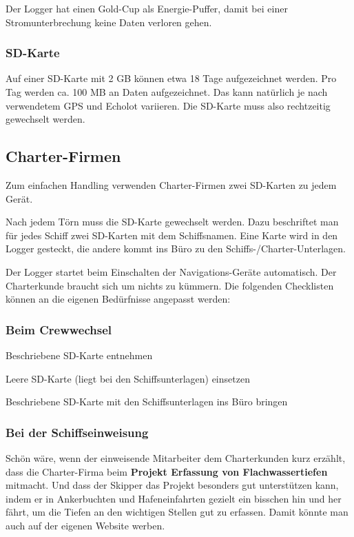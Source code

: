 \documentclass[pdftex, 8pt, paper=130mm:92mm,pagesize]{scrartcl}
\begin{document}
Der Logger hat einen Gold-Cup als Energie-Puffer, damit bei einer Stromunterbrechung keine Daten verloren gehen.	

\subsubsection{SD-Karte}

Auf einer SD-Karte mit 2 GB können etwa 18 Tage aufgezeichnet werden. Pro Tag werden ca. 100 MB an Daten aufgezeichnet. Das kann natürlich je nach verwendetem GPS und Echolot variieren. 
Die SD-Karte muss also rechtzeitig gewechselt werden. 

\subsection{Charter-Firmen}

Zum einfachen Handling verwenden Charter-Firmen zwei SD-Karten zu jedem Gerät. 

Nach jedem Törn muss die SD-Karte gewechselt werden. Dazu beschriftet man für jedes Schiff zwei SD-Karten mit dem Schiffsnamen. Eine Karte wird in den Logger gesteckt, die andere kommt ins Büro zu den Schiffs-/Charter-Unterlagen. 

Der Logger startet beim Einschalten der Navigations-Geräte automatisch. Der Charterkunde braucht sich um nichts zu kümmern. Die folgenden Checklisten können an die eigenen Bedürfnisse angepasst werden: 

\subsubsection{Beim Crewwechsel} 
\begin{compactenum}
\item Beschriebene SD-Karte entnehmen 
\item Leere SD-Karte (liegt bei den Schiffsunterlagen) einsetzen 
\item Beschriebene SD-Karte mit den Schiffsunterlagen ins Büro bringen 
\end{compactenum}

\subsubsection{Bei der Schiffseinweisung} 

Schön wäre, wenn der einweisende Mitarbeiter dem Charterkunden kurz erzählt, dass die Charter-Firma beim \textbf{Projekt \glqq Erfassung von Flachwassertiefen\grqq{}} mitmacht. Und dass der Skipper das Projekt besonders gut unterstützen kann, indem er in Ankerbuchten und Hafeneinfahrten gezielt ein bisschen hin und her fährt, um die Tiefen an den wichtigen Stellen gut zu erfassen. 
Damit könnte man auch auf der eigenen Website werben. 
\end{document}
